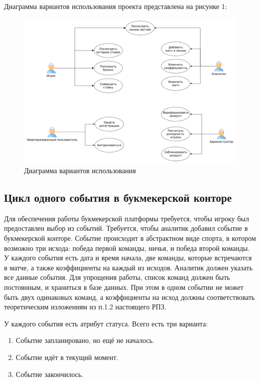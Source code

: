 Диаграмма вариантов использования проекта представлена на рисунке 1:

\FloatBarrier
\begin{figure}[hp]	
	\begin{center}
		\includegraphics[width=\linewidth]{inc/useCase.png}
	\end{center}
	\caption{Диаграмма вариантов использования}
	\label{fig::UseCase}
\end{figure}
\FloatBarrier

\newpage

\subsection{Цикл одного события в букмекерской конторе}
Для обеспечения работы букмекерской платформы требуется, чтобы игроку был предоставлен выбор из событий.
Требуется, чтобы аналитик добавил событие в букмекерской конторе. 
Событие происходит в абстрактном виде спорта, в котором возможно три исхода: победа первой команды, ничья, и победа второй команды. 
У каждого события есть дата и время начала, две команды, которые встречаются в матче, а также коэффициенты на каждый из исходов.
Аналитик должен указать все данные события. 
Для упрощения работы, список команд должен быть постоянным, и храниться в базе данных. 
При этом в одном событии не может быть двух одинаковых команд, а коэффициенты на исход должны соответствовать теоретическим изложениям из п.1.2 настоящего РПЗ.

У каждого события есть атрибут статуса. Всего есть три варианта:
\begin{enumerate}
	\item Событие запланировано, но ещё не началось.
	\item Событие идёт в текущий момент.
	\item Событие закончилось.
\end{enumerate} 

